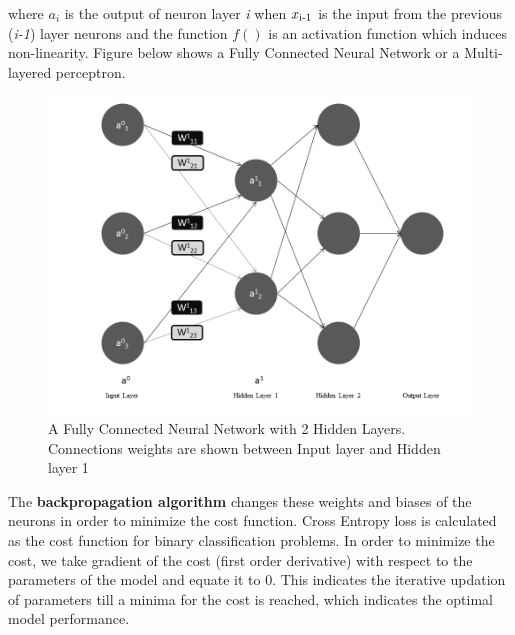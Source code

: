 where $a_i$ is the output of neuron layer \emph{i} when $x\textsubscript{i-1}$ is the input from the previous (\emph{i-1}) layer neurons and the function $f()$ is an activation function which induces non-linearity. Figure below shows a Fully Connected Neural Network or a Multi-layered perceptron. 

\begin{figure}[H]
    \centering
    \includegraphics[scale=0.4]{Images/ANN.png}
    \caption{A Fully Connected Neural Network with 2 Hidden Layers. Connections weights are shown between Input layer and Hidden layer 1}
    \label{fig:ANN}
\end{figure}

The \textbf{backpropagation algorithm} changes these weights and biases of the neurons in order to minimize the cost function. Cross Entropy loss is calculated as the cost function for binary classification problems. In order to minimize the cost, we take gradient of the cost (first order derivative) with respect to the parameters of the model and equate it to 0. This indicates the iterative updation of parameters till a minima for the cost is reached, which indicates the optimal model performance.  \\

